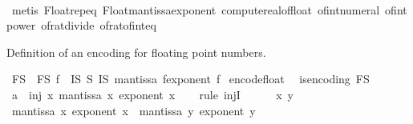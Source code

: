 \begin{isabellebody}
\ \ \isamarkupfalse%
\ {\isacharparenleft}{\kern0pt}metis\ Float{\isachardot}{\kern0pt}rep{\isacharunderscore}{\kern0pt}eq\ Float{\isacharunderscore}{\kern0pt}mantissa{\isacharunderscore}{\kern0pt}exponent\ compute{\isacharunderscore}{\kern0pt}real{\isacharunderscore}{\kern0pt}of{\isacharunderscore}{\kern0pt}float\ of{\isacharunderscore}{\kern0pt}int{\isacharunderscore}{\kern0pt}numeral\ of{\isacharunderscore}{\kern0pt}int{\isacharunderscore}{\kern0pt}power\ of{\isacharunderscore}{\kern0pt}rat{\isacharunderscore}{\kern0pt}divide\ of{\isacharunderscore}{\kern0pt}rat{\isacharunderscore}{\kern0pt}of{\isacharunderscore}{\kern0pt}int{\isacharunderscore}{\kern0pt}eq{\isacharparenright}{\kern0pt}%
\endisatagproof
{\isafoldproof}%
%
\isadelimproof
%
\endisadelimproof
%
\begin{isamarkuptext}%
Definition of an encoding for floating point numbers.%
\end{isamarkuptext}\isamarkuptrue%
\isamarkupfalse%
\ F\isactrlsub S\ \ {\isachardoublequoteopen}F\isactrlsub S\ f\ {\isacharequal}{\kern0pt}\ {\isacharparenleft}{\kern0pt}I\isactrlsub S\ {\isasymtimes}\isactrlsub S\ I\isactrlsub S{\isacharparenright}{\kern0pt}\ {\isacharparenleft}{\kern0pt}mantissa\ f{\isacharcomma}{\kern0pt}exponent\ f{\isacharparenright}{\kern0pt}{\isachardoublequoteclose}\isanewline
\isanewline
{}\isamarkupfalse%
\ encode{\isacharunderscore}{\kern0pt}float{\isacharcolon}{\kern0pt}\isanewline
\ \ {\isachardoublequoteopen}is{\isacharunderscore}{\kern0pt}encoding\ F\isactrlsub S{\isachardoublequoteclose}\isanewline
%
\isadelimproof
%
\endisadelimproof
%
\isatagproof
{}\isamarkupfalse%
\ {\isacharminus}{\kern0pt}\isanewline
\ \ \isamarkupfalse%
\ a\ {\isacharcolon}{\kern0pt}\ {\isachardoublequoteopen}inj\ {\isacharparenleft}{\kern0pt}{\isasymlambda}x{\isachardot}{\kern0pt}\ {\isacharparenleft}{\kern0pt}mantissa\ x{\isacharcomma}{\kern0pt}\ exponent\ x{\isacharparenright}{\kern0pt}{\isacharparenright}{\kern0pt}{\isachardoublequoteclose}\isanewline
\ \ \isamarkupfalse%
\ {\isacharparenleft}{\kern0pt}rule\ injI{\isacharparenright}{\kern0pt}\isanewline
\ \ \ \ \isamarkupfalse%
\ x\ y\isanewline
\ \ \ \ \isamarkupfalse%
\ {\isachardoublequoteopen}{\isacharparenleft}{\kern0pt}mantissa\ x{\isacharcomma}{\kern0pt}\ exponent\ x{\isacharparenright}{\kern0pt}\ {\isacharequal}{\kern0pt}\ {\isacharparenleft}{\kern0pt}mantissa\ y{\isacharcomma}{\kern0pt}\ exponent\ y{\isacharparenright}{\kern0pt}{\isachardoublequoteclose}\isanewline

\end{isabellebody}
